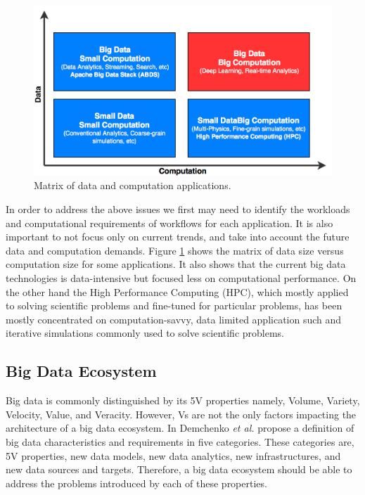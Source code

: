 \documentclass[runningheads,a4paper]{llncs}
\begin{document}
\begin{figure}
\includegraphics[width=\textwidth]{./images/bigdata_matrix.png}
\centering
\caption{Matrix of data and computation applications.}
\label{fig:bigdata_hpc_matrix}
\end{figure}
In order to address the above issues we first may need to identify the workloads and computational requirements of workflows for each application. It is also important to not focus only on current trends, and take into account the future data and computation demands. Figure \ref{fig:bigdata_hpc_matrix} shows the matrix of data size versus computation size for some applications. It also shows that the current big data technologies is data-intensive but focused less on computational performance. On the other hand the High Performance Computing (HPC), which mostly applied to solving scientific problems and fine-tuned for particular problems, has been mostly concentrated on computation-savvy, data limited application such and iterative simulations commonly used to solve scientific problems.\\


\subsection{Big Data Ecosystem}
Big data is commonly distinguished by its 5V properties namely, Volume, Variety, Velocity, Value, and Veracity. However, Vs are not the only factors impacting the architecture of a big data ecosystem. In \cite{demchenko2014defining} Demchenko \textit{et al.} propose a definition of big data characteristics and requirements in five categories. These categories are, 5V properties, new data models, new data analytics, new infrastructures, and new data sources and targets. Therefore, a big data ecosystem should be able to address the problems introduced by each of these properties.\\
\end{document}
